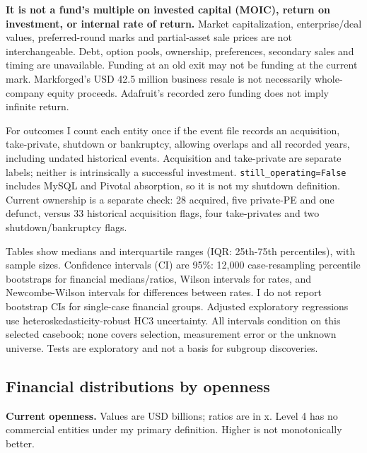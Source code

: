\documentclass{article}
\begin{document}
\textbf{It is not a fund's multiple on invested capital (MOIC), return
on investment, or internal rate of return.} Market capitalization,
enterprise/deal values, preferred-round marks and partial-asset sale
prices are not interchangeable. Debt, option pools, ownership,
preferences, secondary sales and timing are unavailable. Funding at an
old exit may not be funding at the current mark. Markforged's USD 42.5
million business resale is not necessarily whole-company equity
proceeds. Adafruit's recorded zero funding does not imply infinite
return.

For outcomes I count each entity once if the event file records an
acquisition, take-private, shutdown or bankruptcy, allowing overlaps and
all recorded years, including undated historical events. Acquisition and
take-private are separate labels; neither is intrinsically a successful
investment. \texttt{still\_operating=False} includes MySQL and Pivotal
absorption, so it is not my shutdown definition. Current ownership is a
separate check: 28 acquired, five private-PE and one defunct, versus 33
historical acquisition flags, four take-privates and two
shutdown/bankruptcy flags.

Tables show medians and interquartile ranges (IQR: 25th-75th
percentiles), with sample sizes. Confidence intervals (CI) are 95\%:
12,000 case-resampling percentile bootstraps for financial
medians/ratios, Wilson intervals for rates, and Newcombe-Wilson
intervals for differences between rates. I do not report bootstrap CIs
for single-case financial groups. Adjusted exploratory regressions use
heteroskedasticity-robust HC3 uncertainty. All intervals condition on
this selected casebook; none covers selection, measurement error or the
unknown universe. Tests are exploratory and not a basis for subgroup
discoveries.

\subsection{Financial distributions by
openness}\label{financial-distributions-by-openness}

\textbf{Current openness.} Values are USD billions; ratios are in x.
Level 4 has no commercial entities under my primary definition. Higher
is not monotonically better.
\end{document}
